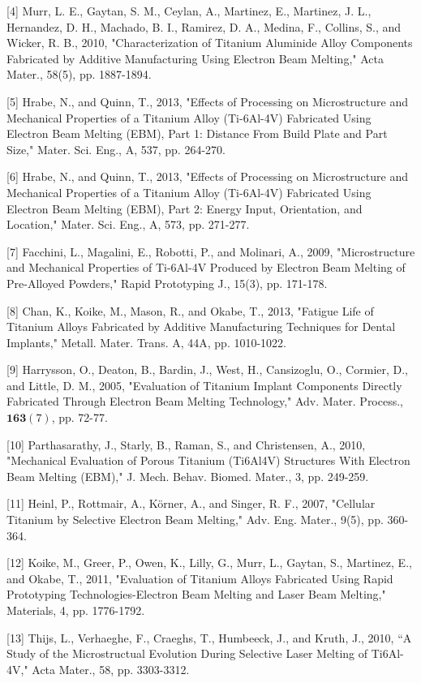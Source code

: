 \documentclass[10pt]{article}
\begin{document}
[4] Murr, L. E., Gaytan, S. M., Ceylan, A., Martinez, E., Martinez, J. L., Hernandez, D. H., Machado, B. I., Ramirez, D. A., Medina, F., Collins, S., and Wicker, R. B., 2010, "Characterization of Titanium Aluminide Alloy Components Fabricated by Additive Manufacturing Using Electron Beam Melting," Acta Mater., 58(5), pp. 1887-1894.

[5] Hrabe, N., and Quinn, T., 2013, "Effects of Processing on Microstructure and Mechanical Properties of a Titanium Alloy (Ti-6Al-4V) Fabricated Using Electron Beam Melting (EBM), Part 1: Distance From Build Plate and Part Size," Mater. Sci. Eng., A, 537, pp. 264-270.

[6] Hrabe, N., and Quinn, T., 2013, "Effects of Processing on Microstructure and Mechanical Properties of a Titanium Alloy (Ti-6Al-4V) Fabricated Using Electron Beam Melting (EBM), Part 2: Energy Input, Orientation, and Location," Mater. Sci. Eng., A, 573, pp. 271-277.

[7] Facchini, L., Magalini, E., Robotti, P., and Molinari, A., 2009, "Microstructure and Mechanical Properties of Ti-6Al-4V Produced by Electron Beam Melting of Pre-Alloyed Powders," Rapid Prototyping J., 15(3), pp. 171-178.

[8] Chan, K., Koike, M., Mason, R., and Okabe, T., 2013, "Fatigue Life of Titanium Alloys Fabricated by Additive Manufacturing Techniques for Dental Implants," Metall. Mater. Trans. A, 44A, pp. 1010-1022.

[9] Harrysson, O., Deaton, B., Bardin, J., West, H., Cansizoglu, O., Cormier, D., and Little, D. M., 2005, "Evaluation of Titanium Implant Components Directly Fabricated Through Electron Beam Melting Technology," Adv. Mater. Process., $\mathbf{1 6 3}(7)$, pp. 72-77.

[10] Parthasarathy, J., Starly, B., Raman, S., and Christensen, A., 2010, "Mechanical Evaluation of Porous Titanium (Ti6Al4V) Structures With Electron Beam Melting (EBM)," J. Mech. Behav. Biomed. Mater., 3, pp. 249-259.

[11] Heinl, P., Rottmair, A., Körner, A., and Singer, R. F., 2007, "Cellular Titanium by Selective Electron Beam Melting," Adv. Eng. Mater., 9(5), pp. 360-364.

[12] Koike, M., Greer, P., Owen, K., Lilly, G., Murr, L., Gaytan, S., Martinez, E., and Okabe, T., 2011, "Evaluation of Titanium Alloys Fabricated Using Rapid Prototyping Technologies-Electron Beam Melting and Laser Beam Melting," Materials, 4, pp. 1776-1792.

[13] Thijs, L., Verhaeghe, F., Craeghs, T., Humbeeck, J., and Kruth, J., 2010, “A Study of the Microstructual Evolution During Selective Laser Melting of Ti6Al-4V," Acta Mater., 58, pp. 3303-3312.
\end{document}
